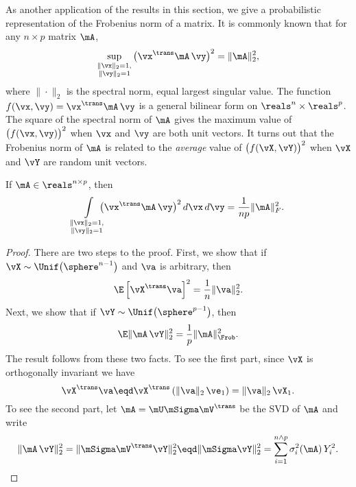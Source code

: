 As another application of the results in this section, we give a probabilistic
representation of the Frobenius norm of a matrix.  It is commonly known that 
for any 
$n \times p$ matrix $\mA$, 
\[
    \sup_{ \substack{
                \| \vx \|_2 = 1, \\
                \| \vy \|_2 = 1 } }
        \big( \vx^\trans \mA \, \vy \big)^2
        =
        \| \mA \|_2^2,
\]
where $\| \cdot \|_2$ is the spectral norm, equal largest singular value.  The 
function
\(
    f( \vx, \vy ) = \vx^\trans \mA \, \vy
\)
is a general bilinear form on $\reals^n \times \reals^p$.  The square of the
spectral norm of $\mA$ gives the maximum value of $\big( f(\vx, \vy) \big)^2$
when $\vx$ and $\vy$ are both unit vectors.
It turns out that the Frobenius norm of $\mA$ is related to the
\emph{average} value of $\big( f(\vX, \vY) \big)^2$ when $\vX$ and $\vY$ are
random unit vectors.

\begin{proposition}\label{P:probabilistic-frob}
    If $\mA \in \reals^{n \times p}$, then
    \[
        \int\limits_{ \substack{
                          \| \vx \|_2 = 1, \\
                          \| \vy \|_2 = 1 } }
            \!\!\!\!\!
            \big(
                \vx^\trans \mA \, \vy
            \big)^2
            \, d\vx \, d\vy
        =
        \frac{1}{np} \| \mA \|_F^2.
    \]
\end{proposition}
\begin{proof}
    There are two steps to the proof.  First, we show that if 
    \(
        \vX \sim \Unif\big( \sphere^{n-1} \big)
    \)
    and $\va$ is arbitrary, then
    \[
        \E \left[ \vX^\trans \va \right]^2 = \frac{1}{n} \| \va \|_2^2.
    \]
    Next, we show that if $\vY \sim \Unif\big( \sphere^{p-1} \big)$, then
    \[
        \E \| \mA \, \vY \|_2^2 = \frac{1}{p} \| \mA \|_\Frob^2.
    \]
    The result follows from these two facts.
    To see the first part, since $\vX$ is orthogonally invariant we have
    \[
        \vX^\trans \va
            \eqd 
                \vX^\trans \left( \| \va \|_2 \, \ve_1 \right)
            = \| \va \|_2 \, \vX_1.
    \]
    To see the second part, let $\mA = \mU \mSigma \mV^\trans$ be the
    SVD of $\mA$ and write
    \[
        \| \mA \, \vY \|_2^2
            =
                \| \mSigma \mV^\trans \vY \|_2^2
            \eqd
                \| \mSigma \vY \|_2^2
            =
                \sum_{i=1}^{n \wedge p} \sigma_i^2( \mA ) \, Y_i^2.
        \qedhere
    \]
\end{proof}
